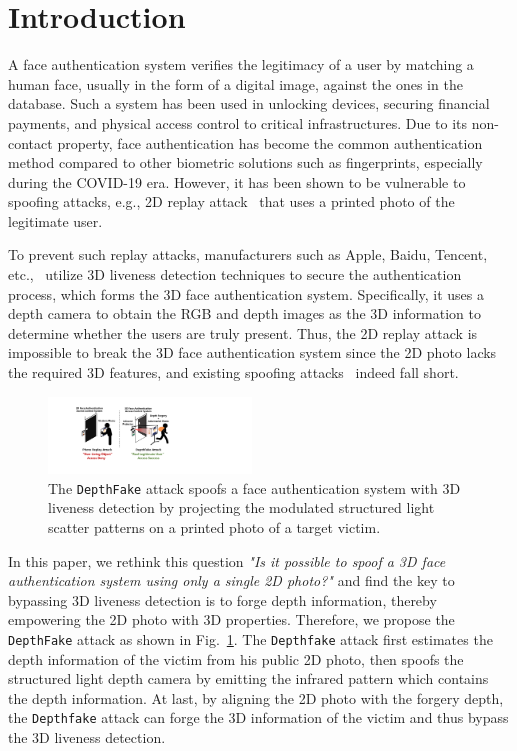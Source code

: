 
\section{Introduction}
A face authentication system verifies the legitimacy of a user by matching a human face, usually in the form of a digital image, against the ones in the database. Such a system has been used in unlocking devices, securing financial payments, and physical access control to critical infrastructures. Due to its non-contact property, face authentication has become the common authentication method compared to other biometric solutions such as fingerprints, especially during the COVID-19 era. However, it has been shown to be vulnerable to spoofing attacks, e.g., 2D replay attack~\cite{chakka2011competition,anjos2011counter,raghavendra2015presentation} that uses a printed photo of the legitimate user.

To prevent such replay attacks, manufacturers such as Apple, Baidu, Tencent, etc.,~\cite{faceid, baidu, tencent} utilize 3D liveness detection techniques to secure the authentication process, which forms the 3D face authentication system. Specifically, it uses a depth camera to obtain the RGB and depth images as the 3D information to determine whether the users are truly present. Thus, the 2D replay attack is impossible to break the 3D face authentication system since the 2D photo lacks the required 3D features, and existing spoofing attacks~\cite{souza2018far, marcel2014handbook} indeed fall short.

\begin{figure}[t]
	\centerline{\includegraphics[width = 0.48\textwidth]{figures/intro.pdf}}
	\vspace{-0.1in}
	\caption{The \texttt{DepthFake} attack spoofs a face authentication system with 3D liveness detection by projecting the modulated structured light scatter patterns on a printed photo of a target victim.}
	\label{intro}
	\vspace{-0.2in}
\end{figure}

In this paper, we rethink this question \emph{"Is it possible to spoof a 3D face authentication system using only a single 2D photo?"} and find the key to bypassing 3D liveness detection is to forge depth information, thereby empowering the 2D photo with 3D properties. Therefore, we propose the \texttt{DepthFake} attack as shown in Fig.~\ref{intro}. The \texttt{Depthfake} attack first estimates the depth information of the victim from his public 2D photo, then spoofs the structured light depth camera by emitting the infrared pattern which contains the depth information. At last, by aligning the 2D photo with the forgery depth, the \texttt{Depthfake} attack can forge the 3D information of the victim and thus bypass the 3D liveness detection.


